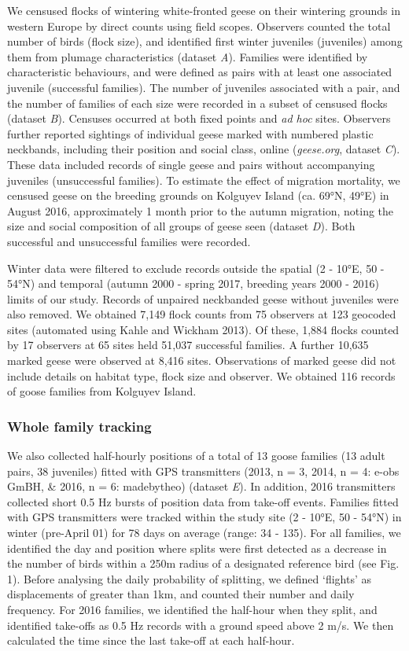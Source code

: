 \documentclass[10pt,twocolumn]{paper}
\begin{document}
We censused flocks of wintering white-fronted geese on their wintering
grounds in western Europe by direct counts using field scopes. Observers
counted the total number of birds (flock size), and identified first
winter juveniles (juveniles) among them from plumage characteristics
(dataset \emph{A}). Families were identified by characteristic
behaviours, and were defined as pairs with at least one associated
juvenile (successful families). The number of juveniles associated with
a pair, and the number of families of each size were recorded in a
subset of censused flocks (dataset \emph{B}). Censuses occurred at both
fixed points and \emph{ad hoc} sites. Observers further reported
sightings of individual geese marked with numbered plastic neckbands,
including their position and social class, online (\emph{geese.org},
dataset \emph{C}). These data included records of single geese and pairs
without accompanying juveniles (unsuccessful families). To estimate the
effect of migration mortality, we censused geese on the breeding grounds
on Kolguyev Island (ca. 69°N, 49°E) in August 2016, approximately 1
month prior to the autumn migration, noting the size and social
composition of all groups of geese seen (dataset \emph{D}). Both
successful and unsuccessful families were recorded.

Winter data were filtered to exclude records outside the spatial (2 -
10°E, 50 - 54°N) and temporal (autumn 2000 - spring 2017, breeding years
2000 - 2016) limits of our study. Records of unpaired neckbanded geese
without juveniles were also removed. We obtained 7,149 flock counts from
75 observers at 123 geocoded sites (automated using Kahle and Wickham
2013). Of these, 1,884 flocks counted by 17 observers at 65 sites held
51,037 successful families. A further 10,635 marked geese were observed
at 8,416 sites. Observations of marked geese did not include details on
habitat type, flock size and observer. We obtained 116 records of goose
families from Kolguyev Island.

\subsubsection{Whole family tracking}\label{whole-family-tracking}

We also collected half-hourly positions of a total of 13 goose families
(13 adult pairs, 38 juveniles) fitted with GPS transmitters (2013, n =
3, 2014, n = 4: e-obs GmBH, \& 2016, n = 6: madebytheo) (dataset
\emph{E}). In addition, 2016 transmitters collected short 0.5 Hz bursts
of position data from take-off events. Families fitted with GPS
transmitters were tracked within the study site (2 - 10°E, 50 - 54°N) in
winter (pre-April 01) for 78 days on average (range: 34 - 135). For all
families, we identified the day and position where splits were first
detected as a decrease in the number of birds within a 250m radius of a
designated reference bird (see Fig. 1). Before analysing the daily
probability of splitting, we defined `flights' as displacements of
greater than 1km, and counted their number and daily frequency. For 2016
families, we identified the half-hour when they split, and identified
take-offs as 0.5 Hz records with a ground speed above 2 m/s. We then
calculated the time since the last take-off at each half-hour.
\end{document}
